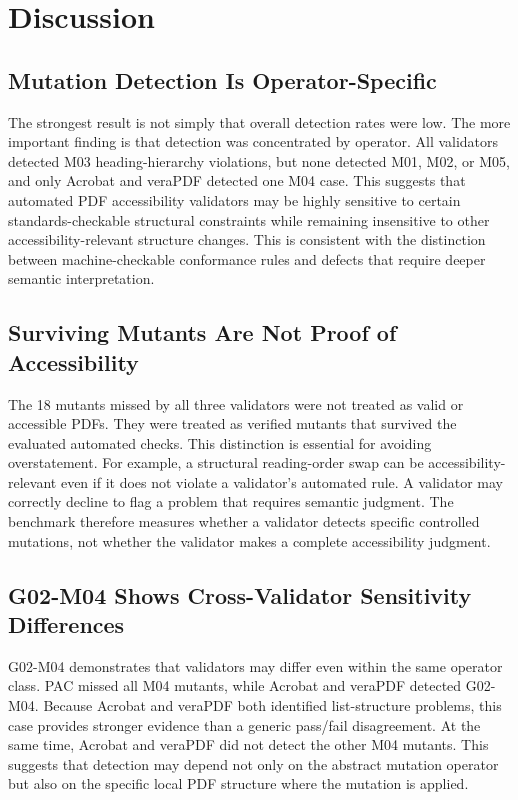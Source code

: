 \documentclass[conference]{IEEEtran}
\begin{document}
\section{Discussion}

\subsection{Mutation Detection Is Operator-Specific}

The strongest result is not simply that overall detection rates were low. The more important finding is that detection was concentrated by operator. All validators detected M03 heading-hierarchy violations, but none detected M01, M02, or M05, and only Acrobat and veraPDF detected one M04 case. This suggests that automated PDF accessibility validators may be highly sensitive to certain standards-checkable structural constraints while remaining insensitive to other accessibility-relevant structure changes. This is consistent with the distinction between machine-checkable conformance rules and defects that require deeper semantic interpretation.

\subsection{Surviving Mutants Are Not Proof of Accessibility}

The 18 mutants missed by all three validators were not treated as valid or accessible PDFs. They were treated as verified mutants that survived the evaluated automated checks. This distinction is essential for avoiding overstatement. For example, a structural reading-order swap can be accessibility-relevant even if it does not violate a validator's automated rule. A validator may correctly decline to flag a problem that requires semantic judgment. The benchmark therefore measures whether a validator detects specific controlled mutations, not whether the validator makes a complete accessibility judgment.

\subsection{G02-M04 Shows Cross-Validator Sensitivity Differences}

G02-M04 demonstrates that validators may differ even within the same operator class. PAC missed all M04 mutants, while Acrobat and veraPDF detected G02-M04. Because Acrobat and veraPDF both identified list-structure problems, this case provides stronger evidence than a generic pass/fail disagreement. At the same time, Acrobat and veraPDF did not detect the other M04 mutants. This suggests that detection may depend not only on the abstract mutation operator but also on the specific local PDF structure where the mutation is applied.
\end{document}
